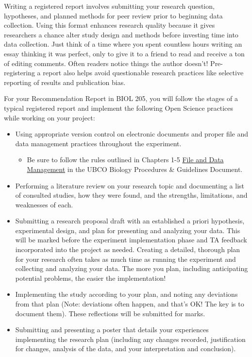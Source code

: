\documentclass[
]{book}
\providecommand{\tightlist}{%
  \setlength{\itemsep}{0pt}\setlength{\parskip}{0pt}}
\begin{document}
Writing a registered report involves submitting your research question, hypotheses, and planned methods for peer review prior to beginning data collection. Using this format enhances research quality because it gives researchers a chance alter study design and methods before investing time into data collection. Just think of a time where you spent countless hours writing an essay thinking it was perfect, only to give it to a friend to read and receive a ton of editing comments. Often readers notice things the author doesn't! Pre-registering a report also helps avoid questionable research practices like selective reporting of results and publication bias.

For your Recommendation Report in BIOL 205, you will follow the stages of a typical registered report and implement the following Open Science practices while working on your project:

\begin{itemize}
\tightlist
\item
  Using appropriate version control on electronic documents and proper file and data management practices throughout the experiment.

  \begin{itemize}
  \tightlist
  \item
    Be sure to follow the rules outlined in Chapters 1-5 \href{https://ubco-biology.github.io/Procedures-and-Guidelines/file-and-data-management.html}{File and Data Management} in the UBCO Biology Procedures \& Guidelines Document.
  \end{itemize}
\item
  Performing a literature review on your research topic and documenting a list of consulted studies, how they were found, and the strengths, limitations, and weaknesses of each.
\item
  Submitting a research proposal draft with an established a priori hypothesis, experimental design, and plan for presenting and analyzing your data. This will be marked before the experiment implementation phase and TA feedback incorporated into the project as needed. Creating a detailed, thorough plan for your research often takes as much time as running the experiment and collecting and analyzing your data. The more you plan, including anticipating potential problems, the easier the implementation!
\item
  Implementing the study according to your plan, and noting any deviations from that plan (Note: deviations often happen, and that's OK! The key is to document them). These reflections will be submitted for marks.
\item
  Submitting and presenting a poster that details your experiences implementing the research plan (including any changes recorded, justification for changes, analysis of the data, and your interpretation and conclusion).
\end{itemize}
\end{document}
